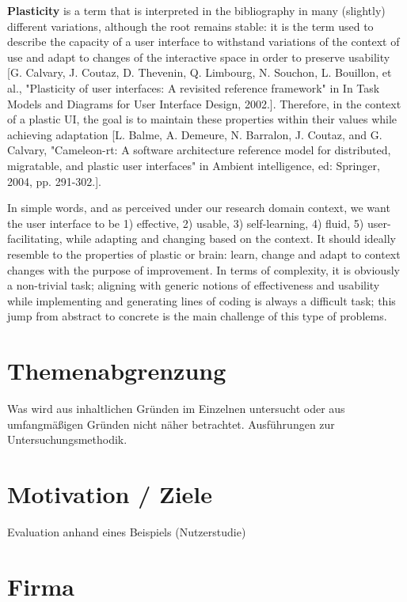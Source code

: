 \textbf{Plasticity} is a term that is interpreted in the bibliography in many (slightly) different variations,
although the root remains stable: it is the term used to describe the capacity of a user interface to withstand variations %
of the context of use and adapt to changes of the interactive space in order to preserve usability [G. Calvary, J. Coutaz, D. Thevenin, Q. Limbourg, N. Souchon, L. Bouillon, et al., "Plasticity of user interfaces: A revisited reference framework" in In Task Models and Diagrams for User Interface Design, 2002.].
Therefore, in the context of a plastic UI, the goal is to maintain these properties within their values while achieving adaptation [L. Balme, A. Demeure, N. Barralon, J. Coutaz, and G. Calvary, "Cameleon-rt: A software architecture reference model for distributed, migratable, and plastic user interfaces" in Ambient intelligence, ed: Springer, 2004, pp. 291-302.].

In simple words, and as perceived under our research domain context, we want the user interface to be
1) effective,
2) usable,
3) self-learning,
4) fluid,
5) user-facilitating,
while adapting and changing based on the context. It should ideally resemble to the properties of plastic or brain:
learn, change and adapt to context changes with the purpose of improvement.
In terms of complexity, it is obviously a non-trivial task; aligning with generic notions of effectiveness and usability
while implementing and generating lines of coding is always a difficult task; this jump from abstract to concrete is
the main challenge of this type of problems.

\section{Themenabgrenzung}
Was wird aus inhaltlichen Gründen im Einzelnen untersucht oder aus umfangmäßigen Gründen nicht näher betrachtet. Ausführungen zur Untersuchungsmethodik.

\section{Motivation / Ziele}
Evaluation anhand eines Beispiels (Nutzerstudie)
\section{Firma}
